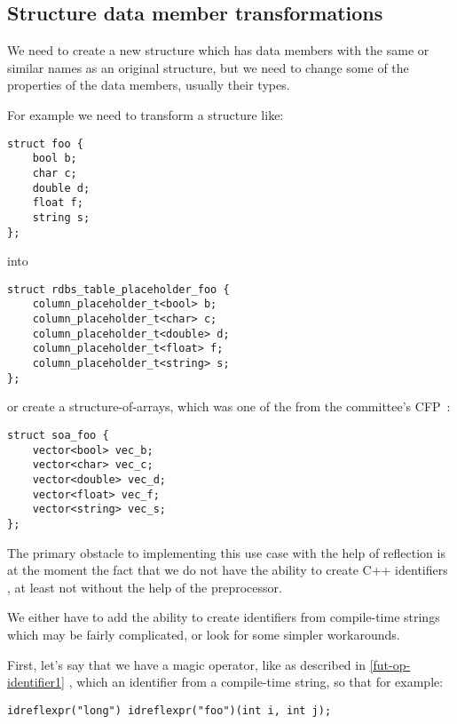 \subsection{Structure data member transformations}
\label{use-case-struct-transf}

We need to create a new structure which has data members with the same or similar
names as an original structure, but we need to change some of the properties
of the data members, usually their types.

For example we need to transform a structure like:

\begin{verbatim}
struct foo {
	bool b;
	char c;
	double d;
	float f;
	string s;
};
\end{verbatim}

into

\begin{verbatim}
struct rdbs_table_placeholder_foo {
	column_placeholder_t<bool> b;
	column_placeholder_t<char> c;
	column_placeholder_t<double> d;
	column_placeholder_t<float> f;
	column_placeholder_t<string> s;
};
\end{verbatim}

or create a structure-of-arrays, which was one of the 
from the committee's CFP~\cite{ISOCPP-N3814}: 

\begin{verbatim}
struct soa_foo {
	vector<bool> vec_b;
	vector<char> vec_c;
	vector<double> vec_d;
	vector<float> vec_f;
	vector<string> vec_s;
};
\end{verbatim}

The primary obstacle to implementing this use case with the help of reflection
is at the moment the fact that we do not have the ability to create C++
identifiers , at least not without the help of
the preprocessor.

We either have to add the ability to create identifiers from compile-time strings
which may be fairly complicated, or look for some simpler workarounds.

First, let's say that we have a magic operator, like \verb@idreflexpr@ as
described in \ref{fut-op-identifier1} , which  an identifier from
a compile-time string, so that for example:

\begin{verbatim}
idreflexpr("long") idreflexpr("foo")(int i, int j);
\end{verbatim}

